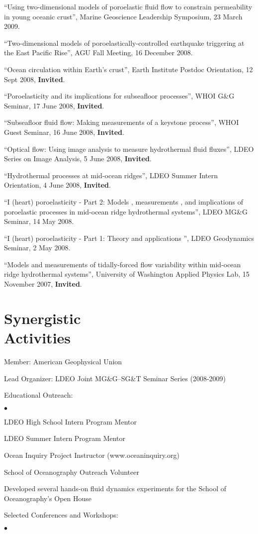\documentclass[11pt]{res}
\newenvironment{list2}{
  \begin{list}{$\bullet$}{%
      \setlength{\itemsep}{0in}
      \setlength{\parsep}{0in} \setlength{\parskip}{0in}
      \setlength{\topsep}{0in} \setlength{\partopsep}{0in} 
      \setlength{\leftmargin}{0.2in}}}{\end{list}}
\begin{document}
\begin{resume}
``Using two-dimensional models of poroelastic fluid flow to constrain permeability in young oceanic crust'', Marine Geoscience Leadership Symposium, 23 March 2009.

``Two-dimensional models of poroelastically-controlled earthquake triggering at the East Pacific Rise'', AGU Fall Meeting, 16 December 2008.

``Ocean circulation within Earth's crust'', Earth Institute Postdoc Orientation, 12 Sept 2008, {\bf Invited}.

``Poroelasticity and its implications for subseafloor processes'', WHOI G\&G Seminar, 17 June 2008, {\bf Invited}.

``Subseafloor fluid flow: Making measurements of a keystone process'', WHOI Guest Seminar, 16 June 2008, {\bf Invited}.

``Optical flow: Using image analysis to measure hydrothermal fluid fluxes'', LDEO Series on Image Analysis, 5 June 2008, {\bf Invited}.

``Hydrothermal processes at mid-ocean ridges'', LDEO Summer Intern Orientation, 4 June 2008, {\bf Invited}.

``I (heart) poroelasticity - Part 2: Models , measurements , and implications of poroelastic processes in mid-ocean ridge hydrothermal systems'', LDEO MG\&G Seminar, 14 May 2008.

``I (heart) poroelasticity - Part 1: Theory and applications '', LDEO Geodynamics Seminar, 2 May 2008.

``Models and measurements of tidally-forced flow variability within mid-ocean ridge hydrothermal systems'', University of Washington Applied Physics Lab, 15 November 2007, {\bf Invited}.

\section{\sc Synergistic\\Activities}
Member: American Geophysical Union

Lead Organizer: LDEO Joint MG\&G--SG\&T Seminar Series (2008-2009)

Educational Outreach:
\begin{list2}
\item LDEO High School Intern Program Mentor
\item LDEO Summer Intern Program Mentor
\item Ocean Inquiry Project Instructor (www.oceaninquiry.org)
\item School of Oceanography Outreach Volunteer
\item Developed several hands-on fluid dynamics experiments for the School of Oceanography's Open House 
\end{list2}
Selected Conferences and Workshops: 
\begin{list2}


\end{list2}
\end{resume}
\end{document}
